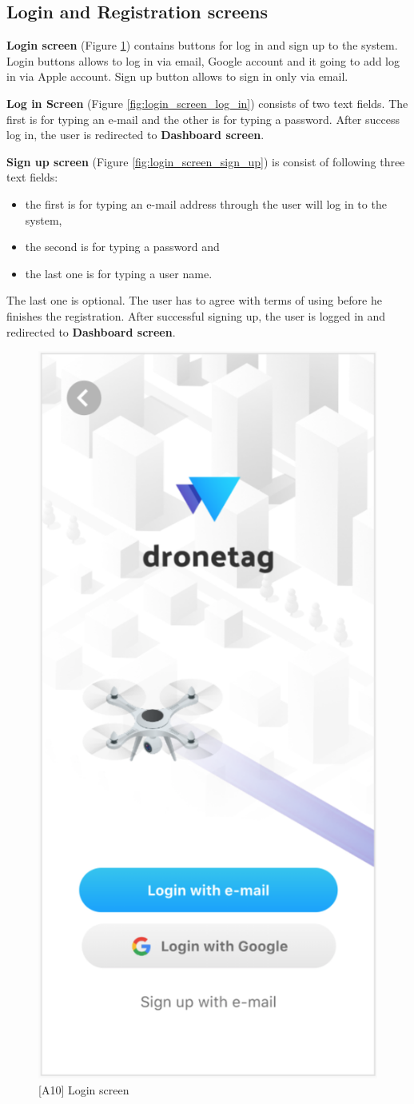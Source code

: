 \subsection{Login and Registration screens}\label{subsec:login-screen}
\textbf{Login screen} (Figure \ref{fig:login_screen}) contains buttons for log in and sign up to the system.
Login buttons allows to log in via email, Google account and it going to add log in via Apple account.
Sign up button allows to sign in only via email.

\textbf{Log in Screen} (Figure \ref{fig:login_screen_log_in}) consists of two text fields.
The first is for typing an e-mail and the other is for typing a password.
After success log in, the user is redirected to \textbf{Dashboard screen}.

\textbf{Sign up screen} (Figure \ref{fig:login_screen_sign_up}) is consist of following three text fields:
\begin{itemize}
    \item the first is for typing an e-mail address through the user will log in to the system,
    \item the second is for typing a password and
    \item the last one is for typing a user name.
\end{itemize}
The last one is optional.
The user has to agree with terms of using before he finishes the registration.
After successful signing up, the user is logged in and redirected to \textbf{Dashboard screen}.


\begin{figure}
    \centering
    \includegraphics[width=.3\linewidth]{assets/user_interface_design/login/login_screen.png}
    \caption{[A10] Login screen}
    \label{fig:login_screen}
\end{figure}

